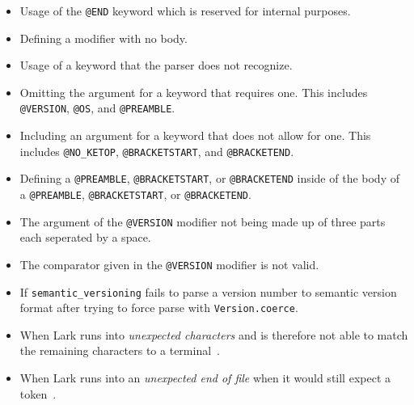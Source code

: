 \begin{itemize}
    \item Usage of the \verb|@END| keyword which is reserved for internal purposes.
    \item Defining a modifier with no body.
    \item Usage of a keyword that the parser does not recognize. 
    \item Omitting the argument for a keyword that requires one. This includes \verb|@VERSION|, \verb|@OS|, and \verb|@PREAMBLE|.
    \item Including an argument for a keyword that does not allow for one. This includes \verb|@NO_KETOP|, \verb|@BRACKETSTART|, and \verb|@BRACKETEND|.
    \item Defining a \verb|@PREAMBLE|, \verb|@BRACKETSTART|, or \verb|@BRACKETEND| inside of the body of a \verb|@PREAMBLE|, \verb|@BRACKETSTART|, or \verb|@BRACKETEND|.
    \item The argument of the \verb|@VERSION| modifier not being made up of three parts each seperated by a space.
    \item The comparator given in the \verb|@VERSION| modifier is not valid.
    \item If \verb|semantic_versioning| fails to parse a version number to semantic version format after trying to force parse with \verb|Version.coerce|.
    \item When Lark runs into \textit{unexpected characters} and is therefore not able to match the remaining characters to a terminal~\cite{py-module-lark-api}.
    \item When Lark runs into an \textit{unexpected end of file} when it would still expect a token~\cite{py-module-lark-api}.
\end{itemize}
